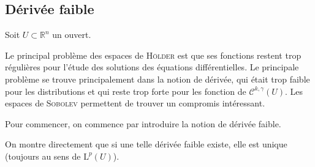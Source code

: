 \documentclass[../distribution.tex]{subfiles}
\begin{document}
	\subsection{Dérivée faible}{
		\noindent Soit $U \subset \mathbb{R}^{n}$ un ouvert.

		\vspace{1em}

		Le principal problème des espaces de \textsc{Hölder} est que ses fonctions restent \flqq{} trop régulières \frqq{} pour l'étude des solutions des équations différentielles. Le principale problème se trouve principalement dans la notion de dérivée, qui était trop faible pour les distributions et qui reste trop forte pour les fonction de $\mathscr{C}^{k, \gamma}(U)$. Les espaces de \textsc{Sobolev} permettent de trouver un compromis intéressant.

		Pour commencer, on commence par introduire la notion de dérivée faible.


		On montre directement que si une telle dérivée faible existe, elle est unique (toujours au sens de $\mathrm{L}^{p}(U)$).


	}
\end{document}
